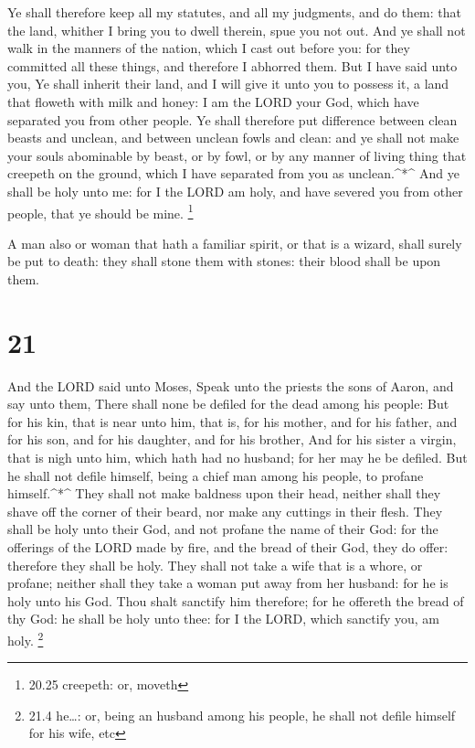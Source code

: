  Ye shall therefore keep all my statutes, and all my
judgments, and do them: that the land, whither I bring you to dwell
therein, spue you not out.  And ye shall not walk in the
manners of the nation, which I cast out before you: for they committed
all these things, and therefore I abhorred them.  But I
have said unto you, Ye shall inherit their land, and I will give it unto
you to possess it, a land that floweth with milk and honey: I am the
LORD your God, which have separated you from other people. 
Ye shall therefore put difference between clean beasts and unclean, and
between unclean fowls and clean: and ye shall not make your souls
abominable by beast, or by fowl, or by any manner of living thing that
creepeth on the ground, which I have separated from you as
unclean.\^{}*\^{}  And ye shall be holy unto me: for I the
LORD am holy, and have severed you from other people, that ye should be
mine. \footnote{20.25 creepeth: or, moveth}

 A man also or woman that hath a familiar spirit, or that
is a wizard, shall surely be put to death: they shall stone them with
stones: their blood shall be upon them.

\hypertarget{section-20}{%
\section{21}\label{section-20}}

 And the LORD said unto Moses, Speak unto the priests the
sons of Aaron, and say unto them, There shall none be defiled for the
dead among his people:  But for his kin, that is near unto
him, that is, for his mother, and for his father, and for his son, and
for his daughter, and for his brother,  And for his sister a
virgin, that is nigh unto him, which hath had no husband; for her may he
be defiled.  But he shall not defile himself, being a chief
man among his people, to profane himself.\^{}*\^{}  They
shall not make baldness upon their head, neither shall they shave off
the corner of their beard, nor make any cuttings in their flesh.
 They shall be holy unto their God, and not profane the name
of their God: for the offerings of the LORD made by fire, and the bread
of their God, they do offer: therefore they shall be holy. 
They shall not take a wife that is a whore, or profane; neither shall
they take a woman put away from her husband: for he is holy unto his
God.  Thou shalt sanctify him therefore; for he offereth the
bread of thy God: he shall be holy unto thee: for I the LORD, which
sanctify you, am holy. \footnote{21.4 he\ldots: or, being an husband
  among his people, he shall not defile himself for his wife, etc}

